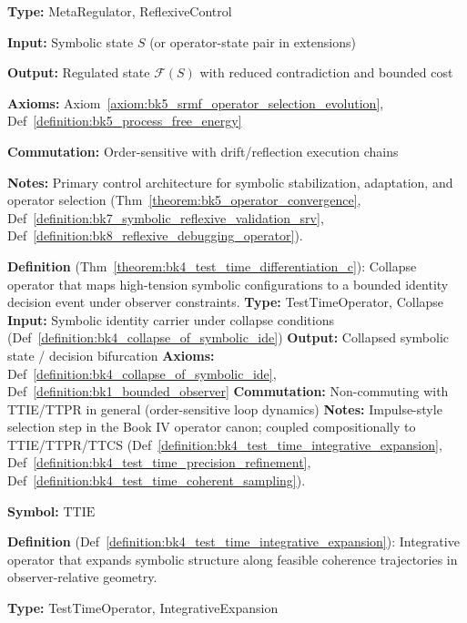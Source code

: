 \begin{description}[leftmargin=2.5cm, style=nextline]
\textbf{Type:} MetaRegulator, ReflexiveControl

\textbf{Input:} Symbolic state \( S \) (or operator-state pair in extensions)

\textbf{Output:} Regulated state \( \mathcal{F}(S) \) with reduced contradiction and bounded cost

\textbf{Axioms:} Axiom~\ref{axiom:bk5_srmf_operator_selection_evolution}, Def~\ref{definition:bk5_process_free_energy}

\textbf{Commutation:} Order-sensitive with drift/reflection execution chains

\textbf{Notes:} Primary control architecture for symbolic stabilization,
adaptation, and operator selection (Thm~\ref{theorem:bk5_operator_convergence},
Def~\ref{definition:bk7_symbolic_reflexive_validation_srv},
Def~\ref{definition:bk8_reflexive_debugging_operator}).

\item[\textbf{Test-Time Differentiation Collapse} \hfill \ensuremath{\mathrm{TTDC}}] 
\label{dict:appA_test_time_differentiation_collapse}
\textbf{Definition} (Thm~\ref{theorem:bk4_test_time_differentiation_c}): Collapse operator that maps high-tension symbolic configurations to a bounded identity decision event under observer constraints.
\textbf{Type:} TestTimeOperator, Collapse
\textbf{Input:} Symbolic identity carrier under collapse conditions (Def~\ref{definition:bk4_collapse_of_symbolic_ide})
\textbf{Output:} Collapsed symbolic state / decision bifurcation
\textbf{Axioms:} Def~\ref{definition:bk4_collapse_of_symbolic_ide}, Def~\ref{definition:bk1_bounded_observer}
\textbf{Commutation:} Non-commuting with TTIE/TTPR in general (order-sensitive loop dynamics)
\textbf{Notes:} Impulse-style selection step in the Book IV operator canon; coupled compositionally to TTIE/TTPR/TTCS (Def~\ref{definition:bk4_test_time_integrative_expansion}, Def~\ref{definition:bk4_test_time_precision_refinement}, Def~\ref{definition:bk4_test_time_coherent_sampling}).

\item[\textbf{Test-Time Integrative Expansion}] 
\label{dict:appA_test_time_integrative_expansion}
\textbf{Symbol:} \( \mathrm{TTIE} \)

\textbf{Definition} (Def~\ref{definition:bk4_test_time_integrative_expansion}): Integrative operator that expands symbolic structure along feasible coherence trajectories in observer-relative geometry.

\textbf{Type:} TestTimeOperator, IntegrativeExpansion


\end{description}
